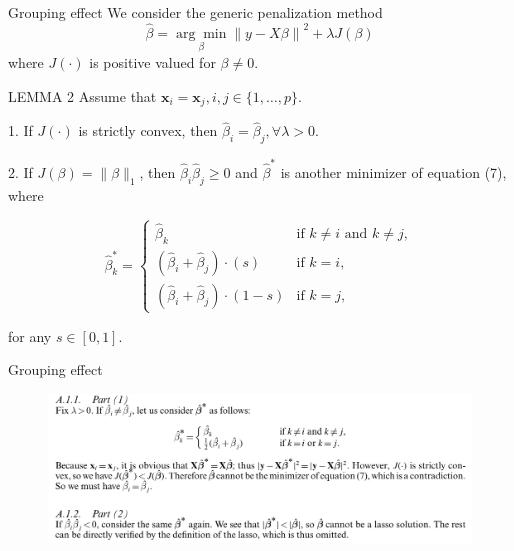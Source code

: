 \begin{frame}{Grouping effect}
    We consider the generic penalization method
\begin{equation}
    \hat{\beta} = \underset{\beta}{\arg\min} \left\lVert y - X\beta \right\rVert^2 + \lambda J(\beta)
\end{equation}
    where $J(\cdot)$ is positive valued for $\beta \neq 0$.

\begin{block}{LEMMA 2}
        Assume that $\textbf{x}_i = \textbf{x}_j, i,j \in \{1, \ldots, p\}$.

1. If \( J(\cdot) \) is strictly convex, then \( \hat{\beta}_i = \hat{\beta}_j, \forall \lambda > 0. \)

2.  If \( J(\beta) = \lVert \beta \rVert_1 \), then \( \hat{\beta}_i \hat{\beta}_j \geq 0 \) and \( \hat{\beta}^* \) is another minimizer of equation (7), where


\[
\hat{\beta}_k^* = 
\begin{cases} 
\hat{\beta}_k & \text{if } k \neq i \text{ and } k \neq j, \\
(\hat{\beta}_i + \hat{\beta}_j) \cdot (s) & \text{if } k = i, \\
(\hat{\beta}_i + \hat{\beta}_j) \cdot (1 - s) & \text{if } k = j,
\end{cases}
\]

for any \( s \in [0, 1] \).
\end{block}

\end{frame}


\begin{frame}{Grouping effect}
    \begin{figure}
        \centering
        \includegraphics[width=1\textwidth]{img/image3.png}
    \end{figure}
\end{frame}

